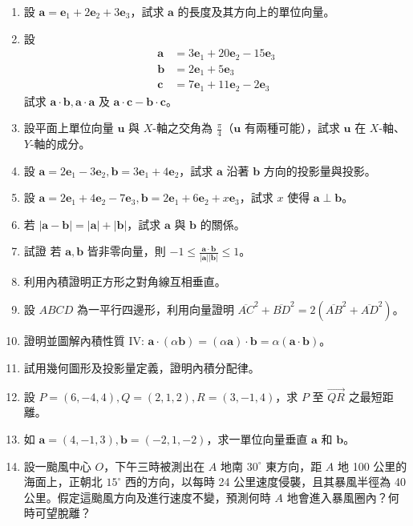 \begin{enumerate}[label=\arabic*., leftmargin=2em]
  \item 設 $\mathbf{a} = \mathbf{e}_1 + 2\mathbf{e}_2 + 3\mathbf{e}_3$，試求 $\mathbf{a}$ 的長度及其方向上的單位向量。
  \item 設
  \begin{align*}
  \mathbf{a} &= 3\mathbf{e}_1 + 20\mathbf{e}_2 - 15\mathbf{e}_3 \\
  \mathbf{b} &= 2\mathbf{e}_1 + 5\mathbf{e}_3 \\
  \mathbf{c} &= 7\mathbf{e}_1 + 11\mathbf{e}_2 - 2\mathbf{e}_3
  \end{align*}
  試求 $\mathbf{a}\cdot\mathbf{b}, \mathbf{a}\cdot\mathbf{a}$ 及 $\mathbf{a}\cdot\mathbf{c} - \mathbf{b}\cdot\mathbf{c}$。
  \item 設平面上單位向量 $\mathbf{u}$ 與 $X$-軸之交角為 $\frac{\pi}{4}$（$\mathbf{u}$ 有兩種可能），試求 $\mathbf{u}$ 在 $X$-軸、$Y$-軸的成分。
  \item 設 $\mathbf{a} = 2\mathbf{e}_1 - 3\mathbf{e}_2, \mathbf{b} = 3\mathbf{e}_1 + 4\mathbf{e}_2$，試求 $\mathbf{a}$ 沿著 $\mathbf{b}$ 方向的投影量與投影。
  \item 設 $\mathbf{a} = 2\mathbf{e}_1 + 4\mathbf{e}_2 - 7\mathbf{e}_3, \mathbf{b} = 2\mathbf{e}_1 + 6\mathbf{e}_2 + x\mathbf{e}_3$，試求 $x$ 使得 $\mathbf{a} \perp \mathbf{b}$。
  \item 若 $|\mathbf{a} - \mathbf{b}| = |\mathbf{a}| + |\mathbf{b}|$，試求 $\mathbf{a}$ 與 $\mathbf{b}$ 的關係。
  \item 試證 若 $\mathbf{a}, \mathbf{b}$ 皆非零向量，則 $-1 \le \frac{\mathbf{a}\cdot\mathbf{b}}{|\mathbf{a}||\mathbf{b}|} \le 1$。
  \item 利用內積證明正方形之對角線互相垂直。
  \item 設 $ABCD$ 為一平行四邊形，利用向量證明 $\overline{AC}^2 + \overline{BD}^2 = 2(\overline{AB}^2 + \overline{AD}^2)$。
  \item 證明並圖解內積性質 IV: $\mathbf{a}\cdot(\alpha\mathbf{b}) = (\alpha\mathbf{a})\cdot\mathbf{b} = \alpha(\mathbf{a}\cdot\mathbf{b})$。
  \item 試用幾何圖形及投影量定義，證明內積分配律。
  \item 設 $P = (6, -4, 4), Q = (2, 1, 2), R = (3, -1, 4)$，求 $P$ 至 $\vec{QR}$ 之最短距離。
  \item 如 $\mathbf{a} = (4, -1, 3), \mathbf{b} = (-2, 1, -2)$，求一單位向量垂直 $\mathbf{a}$ 和 $\mathbf{b}$。
  \item 設一颱風中心 $O$，下午三時被測出在 $A$ 地南 $30^\circ$ 東方向，距 $A$ 地 100 公里的海面上，正朝北 $15^\circ$ 西的方向，以每時 24 公里速度侵襲，且其暴風半徑為 40 公里。假定這颱風方向及進行速度不變，預測何時 $A$ 地會進入暴風圈內？何時可望脫離？

\end{enumerate}
